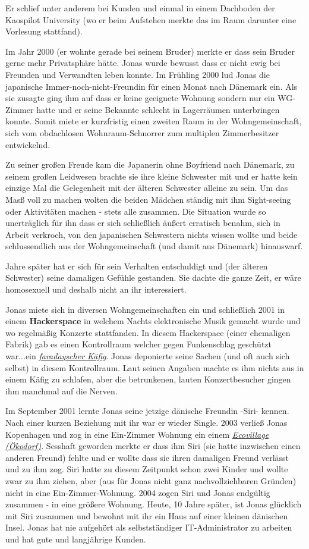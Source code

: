 Er schlief unter anderem bei Kunden und einmal in einem Dachboden der Kaospilot University (wo er beim Aufstehen merkte das im Raum darunter eine Vorlesung stattfand).


Im Jahr 2000 (er wohnte gerade bei seinem Bruder) merkte er dass sein Bruder gerne mehr Privatsphäre hätte. Jonas wurde bewusst dass er nicht ewig bei Freunden und Verwandten leben konnte. Im Frühling 2000 lud Jonas die japanische Immer-noch-nicht-Freundin für einen Monat nach Dänemark ein. Als sie zusagte ging ihm auf dass er keine geeignete Wohnung sondern nur ein WG-Zimmer hatte und er seine Bekannte schlecht in Lagerräumen unterbringen konnte. Somit miete er kurzfristig einen zweiten Raum in der Wohngemeinschaft, sich vom obdachlosen Wohnraum-Schnorrer zum multiplen Zimmerbesitzer entwickelnd.

Zu seiner großen Freude kam die Japanerin ohne Boyfriend nach Dänemark, zu seinem großen Leidwesen brachte sie ihre kleine Schwester mit und er hatte kein einzige Mal die Gelegenheit mit der älteren Schwester alleine zu sein. Um das Masß voll zu machen wolten die beiden Mädchen ständig mit ihm Sight-seeing oder Aktivitäten machen  - stets alle zusammen. Die Situation wurde so unerträglich für ihn dass er sich schließlich äußert erratisch benahm, sich in Arbeit verkroch, von den japanischen Schwestern nichts wissen wollte und beide schlussendlich aus der Wohngemeinschaft (und damit aus Dänemark) hinauswarf.

Jahre später hat er sich für sein Verhalten entschuldigt und (der älteren Schwester) seine damaligen Gefühle gestanden. Sie dachte die ganze Zeit, er wäre homosexuell und deshalb nicht an ihr interessiert. 

Jonas miete sich in diversen Wohngemeinschaften ein und schließlich 2001 in einem \textbf{Hackerspace} in welchem Nachts elektronische Musik gemacht wurde und wo regelmäßig Konzerte stattfanden. In diesem Hackerspace (einer ehemaligen Fabrik) gab es einen Kontrollraum welcher gegen Funkenschlag geschützt war...ein \href{http://goo.gl/wfPa4p}{\textit{faradayscher Käfig}}. Jonas deponierte seine Sachen (und oft auch sich selbst) in diesem Kontrollraum. Laut seinen Angaben machte es ihm nichts aus in einem Käfig zu schlafen, aber die betrunkenen, lauten Konzertbesucher gingen ihm manchmal auf die Nerven.

Im September 2001 lernte Jonas seine jetzige dänische Freundin -Siri- kennen. Nach einer kurzen Beziehung mit ihr war er wieder Single. 2003 verließ Jonas Kopenhagen und zog in eine Ein-Zimmer Wohnung ein einem \href{https://en.wikipedia.org/wiki/Ecovillage}{\textit{Ecovillage (Ökodorf)}}. Sesshaft geworden merkte er dass ihm Siri (sie hatte inzwischen einen anderen Freund) fehlte und er wollte dass sie ihren damaligen Freund verlässt und zu ihm zog. Siri hatte zu diesem Zeitpunkt schon zwei Kinder und wollte zwar zu ihm ziehen, aber (aus für Jonas nicht ganz nachvollziehbaren Gründen) nicht in eine Ein-Zimmer-Wohnung. 2004 zogen Siri und Jonas endgültig zusammen - in eine größere Wohnung. Heute, 10 Jahre später, ist Jonas glücklich mit Siri zusammen und bewohnt mit ihr ein Haus auf einer kleinen dänischen Insel. Jonas hat nie aufgehört als selbstständiger IT-Administrator zu arbeiten und hat gute und langjährige Kunden. 


